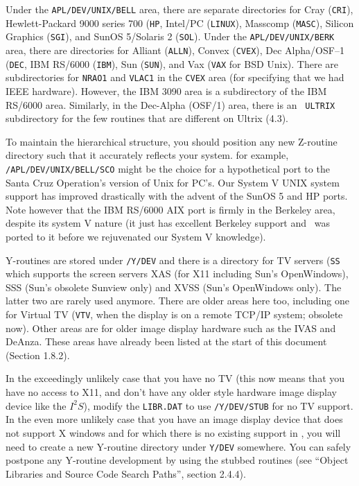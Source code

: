 Under the {\tt APL/DEV/UNIX/BELL} area, there are separate directories for
Cray ({\tt CRI}), Hewlett-Packard 9000 series 700 ({\tt HP}, Intel/PC
({\tt LINUX}), Masscomp ({\tt MASC}), Silicon Graphics ({\tt SGI}), and
SunOS 5/Solaris 2 ({\tt SOL}).  Under the {\tt APL/DEV/UNIX/BERK} area,
there are directories for Alliant ({\tt ALLN}), Convex ({\tt CVEX}), Dec
Alpha/OSF--1 ({\tt DEC}, IBM RS/6000 ({\tt IBM}), Sun ({\tt SUN}), and Vax
({\tt VAX} for BSD Unix).  There are subdirectories for {\tt NRAO1} and
{\tt VLAC1} in the {\tt CVEX} area (for specifying that we had IEEE
hardware).  However, the IBM 3090 area is a subdirectory of the IBM
RS/6000 area.  Similarly, in the Dec-Alpha (OSF/1) area, there is an {\tt
ULTRIX} subdirectory for the few routines that are different on Ultrix
(4.3).

To maintain the hierarchical structure, you should position any new
Z-routine directory such that it accurately reflects your system.  for
example, {\tt \thisver/APL/DEV/UNIX/BELL/SCO} might be the choice for a
hypothetical port to the Santa Cruz Operation's version of Unix for
PC's.  Our System V UNIX system support has improved drastically with
the advent of the SunOS 5 and HP ports.  Note however that the IBM
RS/6000 AIX port is firmly in the Berkeley area, despite its system V
nature (it just has excellent Berkeley support and \AIPS\ was ported to
it before we rejuvenated our System V knowledge).

Y-routines are stored under {\tt\thisver/Y/DEV} and there is a directory
for TV servers ({\tt SS} which supports the screen servers XAS (for X11
including Sun's OpenWindows), SSS (Sun's obsolete Sunview only) and XVSS
(Sun's OpenWindows only).  The latter two are rarely used anymore.
There are older areas here too, including one for Virtual TV ({\tt VTV},
when the display is on a remote TCP/IP system; obsolete now).  Other
areas are for older image display hardware such as the IVAS and DeAnza.
These areas have already been listed at the start of this document
(Section 1.8.2).

In the exceedingly unlikely case that you have no TV (this now means
that you have no access to X11, and don't have any older style hardware
image display device like the $I^2S$), modify the {\tt LIBR.DAT} to use
{\tt\thisver/Y/DEV/STUB} for no TV support.  In the even more unlikely
case that you have an image display device that does not support X
windows and for which there is no existing support in \AIPS, you will
need to create a new Y-routine directory under {\tt Y/DEV} somewhere.
You can safely postpone any Y-routine development by using the stubbed
routines (see ``Object Libraries and Source Code Search Paths'', section
2.4.4).

